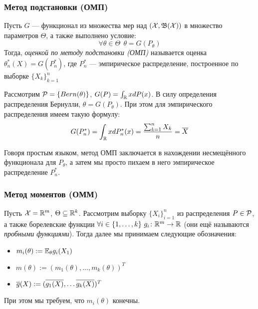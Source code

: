 \subsubsection*{Метод подстановки (ОМП)}

\begin{definition}
	Пусть $G$ --- функционал из множества мер над $(\mathcal{X}, \mathfrak{B}(\mathcal{X}))$ в множество параметров $\Theta$, а также выполнено условие:
	\[
		\forall \theta \in \Theta\ \ \theta = G(P_\theta)
	\]
	Тогда, \textit{оценкой по методу подстановки (ОМП)} называется оценка $\theta_n^*(X) = G(P_n^*)$, где $P_n^*$ --- эмпирическое распределение, построенное по выборке $\{X_k\}_{k = 1}^n$
\end{definition}

\begin{example}
	Рассмотрим $\mathcal{P} = \{Bern(\theta)\}$, $G(P) = \int_{\mathbb{R}} xdP(x)$. В силу определения распределения Бернулли, $\theta = G(P_\theta)$. При этом для эмпирического распределения имеем такую формулу:
	\[
		G(P_n^*) = \int_{\mathbb{R}} xdP_n^*(x) = \frac{\sum_{k = 1}^n X_k}{n} = \overline{X}
	\]
\end{example}

\begin{anote}
	Говоря простым языком, метод ОМП заключается в нахождении несмещённого функционала для $P_\theta$, а затем мы просто пихаем в него эмпирическое распределение $P_n^*$.
\end{anote}

\subsubsection*{Метод моментов (ОММ)}

\begin{note}
	Пусть $\mathcal{X} = \mathbb{R}^m$, $\Theta \subseteq \mathbb{R}^k$. Рассмотрим выборку $\{X_i\}_{i = 1}^n$ из распределения $P \in \mathcal{P}$, а также борелевские функции $\forall i \in \{1, \ldots, k\}\ g_i \colon \mathbb{R}^m \to \mathbb{R}$ (они ещё называются \textit{пробными функциями}). Тогда далее мы принимаем следующие обозначения:
	\begin{itemize}
		\item $m_i(\theta) := \mathbb{E}_\theta g_i(X_1)$
		
		\item $m(\theta) := (m_1(\theta), \ldots, m_k(\theta))^T$
		
		\item $\overline{g}(X) := (\overline{g_1(X)}, \ldots \overline{g_k(X)})^T$
	\end{itemize}
	При этом мы требуем, что $m_i(\theta)$ конечны.
\end{note}

